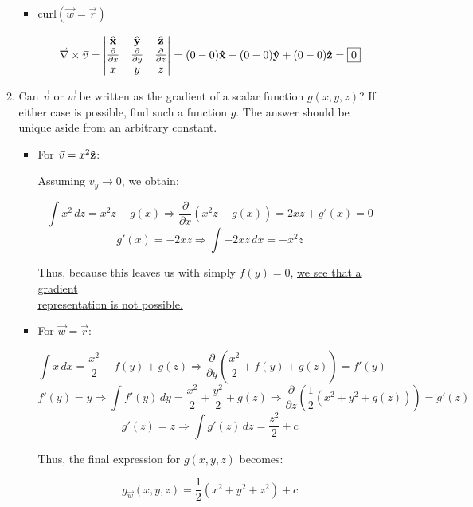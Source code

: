 \begin{enumerate}
\begin{enumerate}
\begin{itemize}
          \item curl$(\vec{w}=\vec{r})$

            $$\vec{\nabla}\times\vec{v}=\left|\begin{matrix}\bold{\hat{x}} & \bold{\hat{y}} & \bold{\hat{z}}\\ \frac{\partial}{\partial x} & \frac{\partial}{\partial y} & \frac{\partial}{\partial z}\\ x & y & z\end{matrix}\right|=(0-0)\bold{\hat{x}}-(0-0)\bold{\hat{y}}+(0-0)\bold{\hat{z}}=\boxed{0}$$

        \end{itemize}

      \item Can $\vec{v}$ or $\vec{w}$ be written as the gradient of a scalar function $g(x,y,z)$? If either case is possible, find
such a function $g$. The answer should be unique aside from an arbitrary constant.

        \begin{itemize}

          \item For $\vec{v}=x^2\bold{\hat{z}}$:

            Assuming $v_y\rightarrow 0$, we obtain:

            $$\int x^2\,dz=x^2z+g(x)\Rightarrow \frac{\partial}{\partial x}(x^2z+g(x))=2xz+g'(x)=0$$
            $$g'(x)=-2xz\Rightarrow \int-2xz\,dx=-x^2z$$

          Thus, because this leaves us with simply $f(y)=0$, \underline{we see that a gradient}\\\underline{ representation is not possible.}

          \item For $\vec{w}=\vec{r}$:

            $$\int x\,dx=\frac{x^2}{2}+f(y)+g(z)\Rightarrow \frac{\partial}{\partial y}\left( \frac{x^2}{2}+f(y)+g(z) \right)=f'(y)$$
            $$f'(y)=y\Rightarrow \int f'(y)\,dy=\frac{x^2}{2}+\frac{y^2}{2}+g(z)\Rightarrow\frac{\partial}{\partial z}\left(\frac{1}{2}\left( x^2+y^2+g(z) \right)\right)=g'(z)$$
            $$g'(z)=z\Rightarrow \int g'(z)\,dz=\frac{z^2}{2}+c$$

            Thus, the final expression for $g(x,y,z)$ becomes:

            $$\boxed{g_{\vec{w}}(x,y,z)=\frac{1}{2}\left( x^2+y^2+z^2 \right) + c}$$

        \end{itemize}


\end{enumerate}
\end{enumerate}
